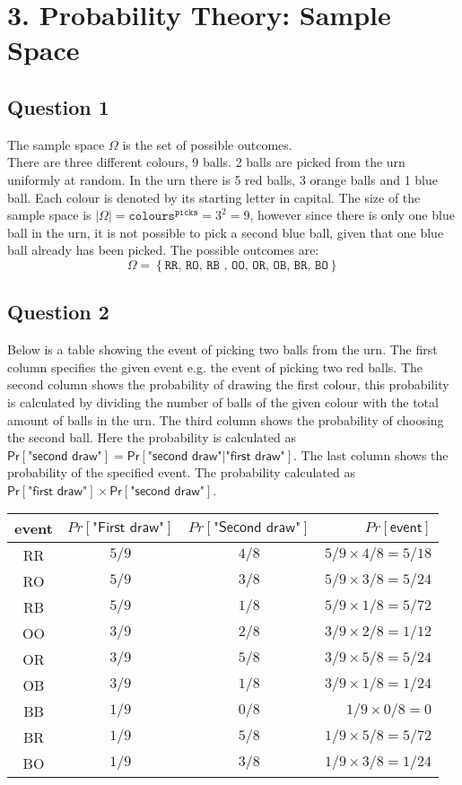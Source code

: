 \documentclass{article}
\begin{document}
\section{3. Probability Theory: Sample Space}
\subsection{Question 1}
The sample space $\Omega$ is the set of possible outcomes. \\
There are three different colours, 9 balls. 2  balls are picked from the urn uniformly at random. In the urn there is 5 red balls, 3 orange balls and 1 blue ball. Each colour is denoted by its starting letter in capital. The size of the sample space is $|\Omega| = \texttt{colours}^{\texttt{picks}} = 3^2 = 9$, however since there is only one blue ball in the urn, it is not possible to pick a second blue ball, given that one blue ball already has been picked. The possible outcomes are:
$$ \Omega = \left\lbrace \texttt{RR, RO, RB , OO, OR, OB, BR, BO} \right\rbrace $$
\subsection{Question 2}
Below is a table showing the event of picking two balls from the urn. The first column specifies the given event e.g. the event of picking two red balls. The second column shows the probability of drawing the first colour, this probability is calculated by dividing the number of balls of the given colour with the total amount of balls in the urn. The third column shows the probability of choosing the second ball. Here the probability is calculated as 
$ \textsf{Pr}[\textsf{"second draw"}] = \textsf{Pr}[\textsf{"second draw"} \vert \textsf{"first draw"}]$.  The last column shows the probability of the specified event. The probability  calculated as $ \textsf{Pr}[\textsf{"first draw"}] \times \textsf{Pr}[\textsf{"second draw"}]$.
\begin{table}[H]
  \centering
  \label{tab:table1}
  \begin{tabular}{c|c|c||r}
    \textsf{event} & $Pr[\textsf{"First draw"}]$ & $Pr[\textsf{"Second draw"}]$ & $Pr[\textsf{event}]$ \\
    \hline
    RR & $5/9$ & $4/8$ &  $ 5/9 \times 4/8 = 5/18$\\
    RO & $5/9$ & $3/8$ &  $ 5/9 \times 3/8 = 5/24$\\
    RB & $5/9$ & $1/8$ &  $ 5/9 \times 1/8 = 5/72$\\
    OO & $3/9$ & $2/8$ &  $ 3/9 \times 2/8 = 1/12$\\
    OR & $3/9$ & $5/8$ &  $ 3/9 \times 5/8 = 5/24$\\
    OB & $3/9$ & $1/8$ &  $ 3/9 \times 1/8 = 1/24$\\
    BB & $1/9$ & $0/8$ &  $ 1/9 \times 0/8 = 0$\\
    BR & $1/9$ & $5/8$ &  $ 1/9 \times 5/8 = 5/72$\\
    BO & $1/9$ & $3/8$ &  $ 1/9 \times 3/8 = 1/24$\\
  \end{tabular}
\end{table}
\end{document}
